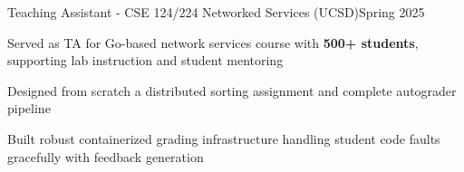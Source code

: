 \begin{joblong}{Teaching Assistant - CSE 124/224 Networked Services (UCSD)}{Spring 2025}
	\item Served as TA for Go-based network services course with \textbf{500+ students}, supporting lab instruction and student mentoring
	\item Designed from scratch a distributed sorting assignment and complete autograder pipeline
	\item Built robust containerized grading infrastructure handling student code faults gracefully with feedback generation
\end{joblong}
